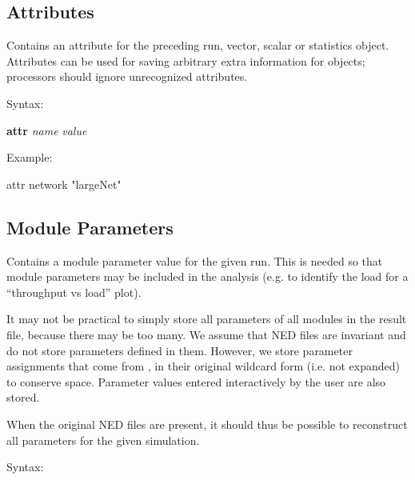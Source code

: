 

\subsection{Attributes}
\label{sec:result-file-formats:opp:attributes}

Contains an attribute for the preceding run, vector, scalar or
statistics object. Attributes can be used for saving arbitrary
extra information for objects; processors should ignore unrecognized
attributes.

Syntax:

\hspace{20mm} \textbf{attr} \textit{name} \textit{value}

Example:

\begin{filelisting}
attr network "largeNet"
\end{filelisting}


\subsection{Module Parameters}
\label{sec:result-file-formats:opp:module-parameters}

Contains a module parameter value for the given run. This is needed so
that module parameters may be included in the analysis (e.g. to
identify the load for a ``throughput vs load'' plot).

It may not be practical to simply store all parameters of all modules in the
result file, because there may be too many. We assume that NED files are
invariant and do not store parameters defined in them. However, we store
parameter assignments that come from , in their original
wildcard form (i.e. not expanded) to conserve space. Parameter values
entered interactively by the user are also stored.

When the original NED files are present, it should thus be possible to
reconstruct all parameters for the given simulation.

Syntax:

